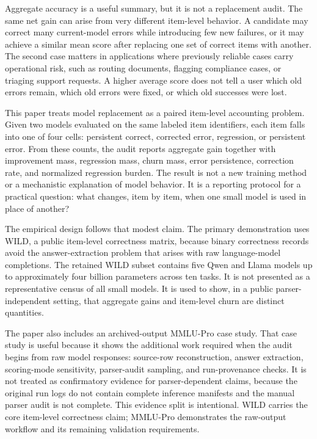\documentclass[manuscript, screen, review, nonacm]{jair}
\begin{document}
Aggregate accuracy is a useful summary, but it is not a replacement audit. The same net gain can arise from very different item-level behavior. A candidate may correct many current-model errors while introducing few new failures, or it may achieve a similar mean score after replacing one set of correct items with another. The second case matters in applications where previously reliable cases carry operational risk, such as routing documents, flagging compliance cases, or triaging support requests. A higher average score does not tell a user which old errors remain, which old errors were fixed, or which old successes were lost.

This paper treats model replacement as a paired item-level accounting problem. Given two models evaluated on the same labeled item identifiers, each item falls into one of four cells: persistent correct, corrected error, regression, or persistent error. From these counts, the audit reports aggregate gain together with improvement mass, regression mass, churn mass, error persistence, correction rate, and normalized regression burden. The result is not a new training method or a mechanistic explanation of model behavior. It is a reporting protocol for a practical question: what changes, item by item, when one small model is used in place of another?

The empirical design follows that modest claim. The primary demonstration uses WILD, a public item-level correctness matrix, because binary correctness records avoid the answer-extraction problem that arises with raw language-model completions. The retained WILD subset contains five Qwen and Llama models up to approximately four billion parameters across ten tasks. It is not presented as a representative census of all small models. It is used to show, in a public parser-independent setting, that aggregate gains and item-level churn are distinct quantities.

The paper also includes an archived-output MMLU-Pro case study. That case study is useful because it shows the additional work required when the audit begins from raw model responses: source-row reconstruction, answer extraction, scoring-mode sensitivity, parser-audit sampling, and run-provenance checks. It is not treated as confirmatory evidence for parser-dependent claims, because the original run logs do not contain complete inference manifests and the manual parser audit is not complete. This evidence split is intentional. WILD carries the core item-level correctness claim; MMLU-Pro demonstrates the raw-output workflow and its remaining validation requirements.
\end{document}
